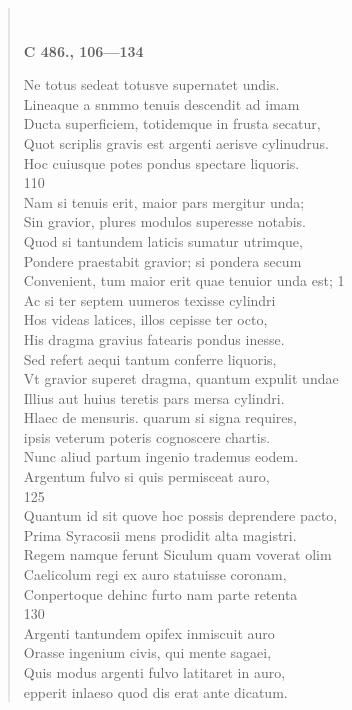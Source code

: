 \documentclass[11pt, a4paper]{report}
\begin{document}
\begin{verse}
        ﻿\pagebreak 
     \marginpar{[34]} \begin{center} \textbf{C 486., 106—134} \end{center}Ne totus sedeat totusve supernatet undis. \\ Lineaque a snmmo tenuis descendit ad imam \\ Ducta superficiem, totidemque in frusta secatur, \\ Quot scriplis gravis est argenti aerisve cylinudrus. \\ Hoc cuiusque potes pondus spectare liquoris. \\ 110 \\ Nam si tenuis erit, maior pars mergitur unda; \\ Sin gravior, plures modulos superesse notabis. \\ Quod si tantundem laticis sumatur utrimque, \\ Pondere praestabit gravior; si pondera secum \\ Convenient, tum maior erit quae tenuior unda est; 1 \\ Ac si ter septem uumeros texisse cylindri \\ Hos videas latices, illos cepisse ter octo, \\ His dragma gravius fatearis pondus inesse. \\ Sed refert aequi tantum conferre liquoris, \\ Vt gravior superet dragma, quantum expulit undae \\ Illius aut huius teretis pars mersa cylindri. \\ Hlaec de mensuris. quarum si signa requires, \\ ipsis veterum poteris cognoscere chartis. \\ Nunc aliud partum ingenio trademus eodem. \\ Argentum fulvo si quis permisceat auro, \\ 125 \\ Quantum id sit quove hoc possis deprendere pacto, \\ Prima Syracosii mens prodidit alta magistri. \\ Regem namque ferunt Siculum quam voverat olim \\ Caelicolum regi ex auro statuisse coronam, \\ Conpertoque dehinc furto nam parte retenta \\ 130 \\ Argenti tantundem opifex inmiscuit auro \\ Orasse ingenium civis, qui mente sagaei, \\ Quis modus argenti fulvo latitaret in auro, \\ epperit inlaeso quod dis erat ante dicatum. \\ 

\end{verse}
\end{document}
